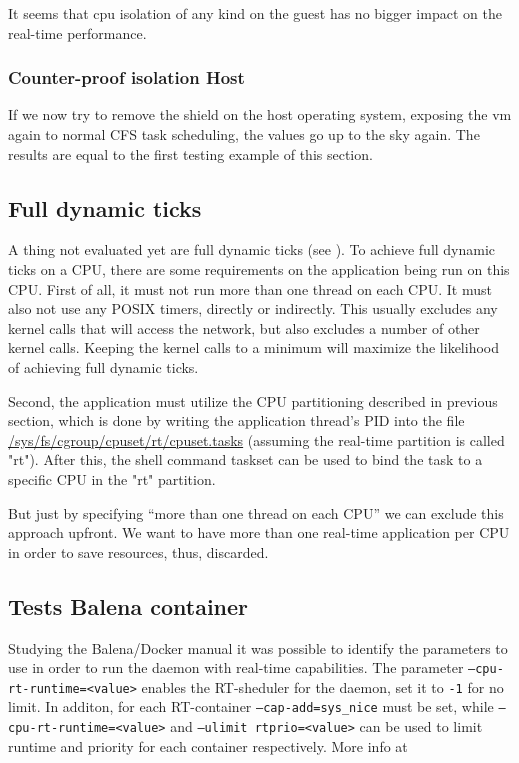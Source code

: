 \documentclass[]{scrartcl}
\begin{document}
It seems that cpu isolation of any kind on the guest has no bigger impact on the real-time performance.

\subsubsection{Counter-proof isolation Host}

If we now try to remove the shield on the host operating system, exposing the vm again to normal CFS task scheduling, the values go up to the sky again. The results are equal to the first testing example of this section.

\subsection{Full dynamic ticks}

A thing not evaluated yet are full dynamic ticks (see \cite{lrt02}). To achieve full dynamic ticks on a CPU, there are some requirements on the application being run on this CPU. First of all, it must not run more than one thread on each CPU. It must also not use any POSIX timers, directly or indirectly. This usually excludes any kernel calls that will access the network, but also excludes a number of other kernel calls. Keeping the kernel calls to a minimum will maximize the likelihood of achieving full dynamic ticks.

Second, the application must utilize the CPU partitioning described in previous section, which is done by writing the application thread's PID into the file \url{/sys/fs/cgroup/cpuset/rt/cpuset.tasks} (assuming the real-time partition is called "rt"). After this, the shell command taskset can be used to bind the task to a specific CPU in the "rt" partition.

But just by specifying ``more than one thread on each CPU'' we can exclude this approach upfront. We want to have more than one real-time application per CPU in order to save resources, thus, discarded.

\subsection{Tests Balena container}

Studying the Balena/Docker manual it was possible to identify the parameters to use in order to run the daemon with real-time capabilities. The parameter \texttt{--cpu-rt-runtime=<value>} enables the RT-sheduler for the daemon, set it to \texttt{-1} for no limit. In additon, for each RT-container \texttt{--cap-add=sys\_nice} must be set, while \texttt{--cpu-rt-runtime=<value>} and \texttt{--ulimit rtprio=<value>} can be used to limit runtime and priority for each container respectively.
More info at \cite{docker06}
\end{document}
